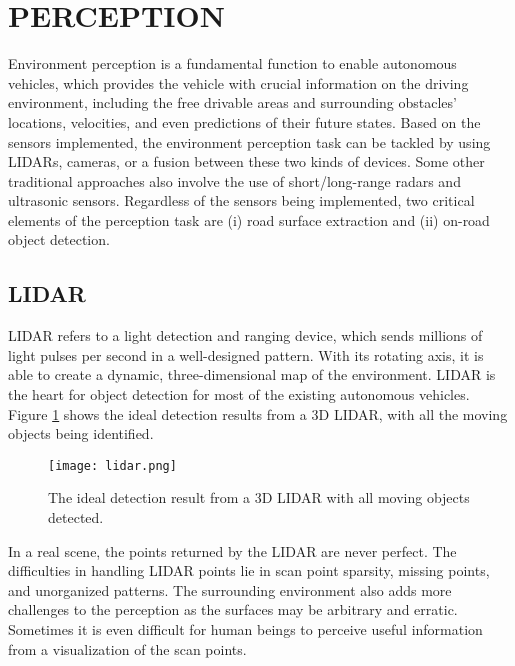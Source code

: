 \section{PERCEPTION}

Environment perception is a fundamental function to enable autonomous vehicles,
which provides the vehicle with crucial information on the driving environment,
including the free drivable areas and surrounding obstacles’ locations,
velocities, and even predictions of their future states. Based on the sensors
implemented, the environment perception task can be tackled by using LIDARs,
cameras, or a fusion between these two kinds of devices. Some other traditional
approaches also involve the use of short/long-range radars and ultrasonic
sensors. Regardless of the sensors being implemented, two critical elements of
the perception task are (i) road surface extraction and (ii) on-road object
detection.

\subsection{LIDAR}

LIDAR refers to a light detection and ranging device, which sends millions of
light pulses per second in a well-designed pattern. With its rotating axis, it
is able to create a dynamic, three-dimensional map of the environment. LIDAR is
the heart for object detection for most of the existing autonomous vehicles.
Figure \ref{fig:lidar} shows the ideal detection results from a 3D LIDAR, with
all the moving objects being identified.

\begin{figure}[h]
    \centering
    \texttt{[image: lidar.png]}
    \caption{The ideal detection result from a 3D LIDAR with all moving objects detected.}
    \label{fig:lidar}
\end{figure}

In a real scene, the points returned by the LIDAR are never perfect. The
difficulties in handling LIDAR points lie in scan point sparsity, missing
points, and unorganized patterns. The surrounding environment also adds more
challenges to the perception as the surfaces may be arbitrary and erratic.
Sometimes it is even difficult for human beings to perceive useful information
from a visualization of the scan points.


